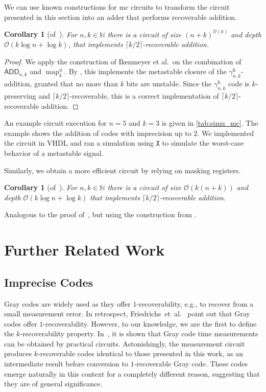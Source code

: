 \documentclass[9pt,journal,compsoc]{IEEEtran}
\newtheorem{corollary}[theorem]{Corollary}
\theoremstyle{remark}
\DeclareMathOperator{\map}{map}
\newcommand{\mfx}{\mathtt{X}}
\newcommand{\IN}{\mathbb{N}}
\newcommand{\ceil}[1]{\lceil{#1}\rceil}
\newcommand{\gHyb}[1]{\gamma_{#1}^{\operatorname{h}}}
\newcommand{\mUnary}[1]{\map_{#1}^{\operatorname{u}}}
\newcommand{\BLM}{{\textsf{ADD}}_{n,k}}
\newcommand{\BO}{\mathcal{O}}
\begin{document}
We can use known constructions for mc circuits to transform the circuit presented in this section into an adder that performs recoverable addition.
\begin{corollary}[of~\cite{ikenmeyer18complexity}]\label{coro:ikenmeyer}
  For $n,k\in\IN$ there is a circuit of size $(n+k)^{\BO(k)}$ and depth $\BO(k\log n + \log k)$,
    that implements $\ceil{k/2}$-recoverable addition.
\end{corollary}
\begin{proof}
    We apply the construction of  Ikenmeyer et al.\ on the combination of $\BLM$ and $\mUnary{k}$. By \cite{ikenmeyer18complexity}, this implements the metastable closure of the $\gHyb{n,k}$-addition, granted that no more than $k$ bits are unstable. Since the $\gHyb{n,k}$ code is $k$-preserving and $\ceil{k/2}$-recoverable, this is a correct implementation of $\ceil{k/2}$-recoverable addition.
\end{proof}

An example circuit execution for $n=5$ and $k=3$ is given in \cref{tab:simu_mc}.
The example shows the addition of codes with imprecision up to $2$.
We implemented the circuit in VHDL and ran a simulation using $\mfx$ to simulate
  the worst-case behavior of a metastable signal.

Similarly, we obtain a more efficient circuit by relying on masking registers.
\begin{corollary}[of~\cite{friedrichs18containing}]
  For $n,k\in\IN$ there is a circuit of size $\BO(k(n+k))$ and depth $\BO(k\log n + \log k)$ that implements $\ceil{k/2}$-recoverable addition.
\end{corollary}
\begin{IEEEproof}
Analogous to the proof of~, but using the construction from \cite{friedrichs18containing}.
\end{IEEEproof}
\section{Further Related Work}\label{sec:related}

\subsection*{Imprecise Codes}

Gray codes are widely used as they offer $1$-recoverability,
  e.g., to recover from a small measurement error.
In retrospect, Friedrichs~et~al.~\cite{friedrichs18containing} point out that Gray
  codes offer $1$-recoverability.
However, to our knowledge, we are the first to define the $k$-recoverability
  property.
In~\cite{fuegger17aware}, it is shown that Gray code time measurements
  can be obtained by practical circuits.
Astonishingly, the measurement circuit produces $k$-recoverable
  codes identical to those presented in this work, as an intermediate result before conversion
  to $1$-recoverable Gray code.
These codes emerge naturally in this context for a completely different
  reason, suggesting that they are of general significance.
\end{document}
